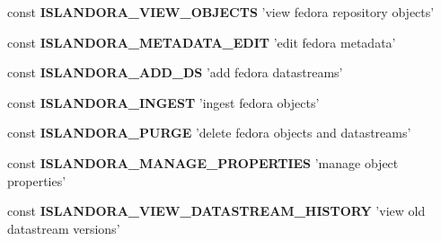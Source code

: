\begin{DoxyCompactItemize}
\item 
\hypertarget{islandora__bioinformatics__base_8module_a28c9d3c2ccde4a6edc33c35ce1009d1a}{const {\bfseries I\+S\+L\+A\+N\+D\+O\+R\+A\+\_\+\+V\+I\+E\+W\+\_\+\+O\+B\+J\+E\+C\+T\+S} 'view fedora repository objects'}\label{islandora__bioinformatics__base_8module_a28c9d3c2ccde4a6edc33c35ce1009d1a}

\item 
\hypertarget{islandora__bioinformatics__base_8module_adbfdad3b2fb5fa8aecb51ec1799e4c18}{const {\bfseries I\+S\+L\+A\+N\+D\+O\+R\+A\+\_\+\+M\+E\+T\+A\+D\+A\+T\+A\+\_\+\+E\+D\+I\+T} 'edit fedora metadata'}\label{islandora__bioinformatics__base_8module_adbfdad3b2fb5fa8aecb51ec1799e4c18}

\item 
\hypertarget{islandora__bioinformatics__base_8module_a5d6394b69757c946ebf283fe66b96687}{const {\bfseries I\+S\+L\+A\+N\+D\+O\+R\+A\+\_\+\+A\+D\+D\+\_\+\+D\+S} 'add fedora datastreams'}\label{islandora__bioinformatics__base_8module_a5d6394b69757c946ebf283fe66b96687}

\item 
\hypertarget{islandora__bioinformatics__base_8module_a3a978dee38e8450c6d41dd944191fc68}{const {\bfseries I\+S\+L\+A\+N\+D\+O\+R\+A\+\_\+\+I\+N\+G\+E\+S\+T} 'ingest fedora objects'}\label{islandora__bioinformatics__base_8module_a3a978dee38e8450c6d41dd944191fc68}

\item 
\hypertarget{islandora__bioinformatics__base_8module_a3e4c4e51a06a165d18efce380a14d6f0}{const {\bfseries I\+S\+L\+A\+N\+D\+O\+R\+A\+\_\+\+P\+U\+R\+G\+E} 'delete fedora objects and datastreams'}\label{islandora__bioinformatics__base_8module_a3e4c4e51a06a165d18efce380a14d6f0}

\item 
\hypertarget{islandora__bioinformatics__base_8module_ab902d3a4d03cf80f4b980ae96bb48b6a}{const {\bfseries I\+S\+L\+A\+N\+D\+O\+R\+A\+\_\+\+M\+A\+N\+A\+G\+E\+\_\+\+P\+R\+O\+P\+E\+R\+T\+I\+E\+S} 'manage object properties'}\label{islandora__bioinformatics__base_8module_ab902d3a4d03cf80f4b980ae96bb48b6a}

\item 
\hypertarget{islandora__bioinformatics__base_8module_a12aa5cd7b920c84c341df9e762346b91}{const {\bfseries I\+S\+L\+A\+N\+D\+O\+R\+A\+\_\+\+V\+I\+E\+W\+\_\+\+D\+A\+T\+A\+S\+T\+R\+E\+A\+M\+\_\+\+H\+I\+S\+T\+O\+R\+Y} 'view old datastream versions'}\label{islandora__bioinformatics__base_8module_a12aa5cd7b920c84c341df9e762346b91}


\end{DoxyCompactItemize}
